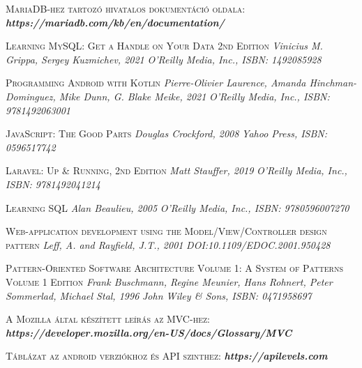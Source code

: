 \documentclass[
]{thesis-ekf}
\theoremstyle{definition}
\theoremstyle{remark}
\begin{document}
\begin{thebibliography}{2}
		\textsc{MariaDB-hez tartozó hivatalos dokumentáció oldala:}
		\newline
		\emph{\bf{https://mariadb.com/kb/en/documentation/}}
		
		\textsc{Learning MySQL: Get a Handle on Your Data 2nd Edition}
		\newline
		\emph{Vinicius M. Grippa, Sergey Kuzmichev,  2021}
		\emph{O'Reilly Media, Inc., ISBN: 1492085928}
		
		\textsc{Programming Android with Kotlin}
		\newline
		\emph{Pierre-Olivier Laurence, Amanda Hinchman-Dominguez, Mike Dunn, G. Blake Meike,  2021}
		\emph{O'Reilly Media, Inc., ISBN: 9781492063001}
		
		\textsc{JavaScript: The Good Parts}
		\newline
		\emph{Douglas Crockford, 2008}
		\emph{Yahoo Press, ISBN: 0596517742}
		
		\textsc{Laravel: Up \& Running, 2nd Edition}
		\newline
		\emph{Matt Stauffer, 2019}
		\emph{O'Reilly Media, Inc., ISBN: 9781492041214}
		
		\textsc{Learning SQL}
		\newline
		\emph{Alan Beaulieu, 2005}
		\emph{O'Reilly Media, Inc., ISBN: 9780596007270}
		
		\textsc{Web-application development using the Model/View/Controller design pattern}
		\newline
		\emph{Leff, A. and Rayfield, J.T., 2001}
		\emph{DOI:10.1109/EDOC.2001.950428}
		
		\textsc{Pattern-Oriented Software Architecture Volume 1: A System of Patterns Volume 1 Edition}
		\newline
		\emph{Frank Buschmann, Regine Meunier, Hans Rohnert, Peter Sommerlad, Michael Stal, 1996}
		\emph{John Wiley \& Sons, ISBN: 0471958697}
		
		\textsc{A Mozilla által készített leírás az MVC-hez:}
		\newline
		\emph{\bf{https://developer.mozilla.org/en-US/docs/Glossary/MVC}}
		
		\textsc{Táblázat az android verziókhoz és API szinthez:}
		\newline
		\emph{\bf{https://apilevels.com}}
		

\end{thebibliography}
\end{document}
